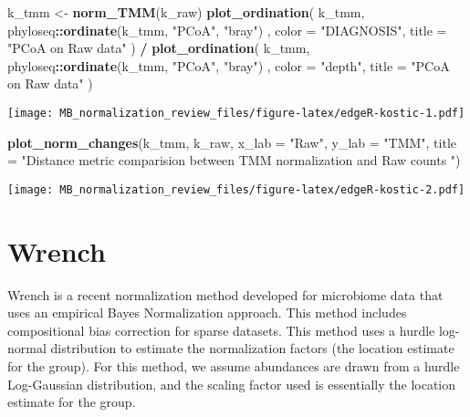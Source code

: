 \documentclass[
]{book}
\newenvironment{Shaded}{\begin{snugshade}}{\end{snugshade}}
\newcommand{\DataTypeTok}[1]{\textcolor[rgb]{0.13,0.29,0.53}{#1}}
\newcommand{\KeywordTok}[1]{\textcolor[rgb]{0.13,0.29,0.53}{\textbf{#1}}}
\newcommand{\NormalTok}[1]{#1}
\newcommand{\OperatorTok}[1]{\textcolor[rgb]{0.81,0.36,0.00}{\textbf{#1}}}
\newcommand{\StringTok}[1]{\textcolor[rgb]{0.31,0.60,0.02}{#1}}
\begin{document}
\begin{Shaded}
\begin{Highlighting}[]
\NormalTok{k\_tmm \textless{}{-}}\StringTok{ }\KeywordTok{norm\_TMM}\NormalTok{(k\_raw)}
\KeywordTok{plot\_ordination}\NormalTok{(}
\NormalTok{    k\_tmm,}
\NormalTok{    phyloseq}\OperatorTok{::}\KeywordTok{ordinate}\NormalTok{(k\_tmm, }\StringTok{"PCoA"}\NormalTok{, }\StringTok{"bray"}\NormalTok{) ,}
    \DataTypeTok{color =} \StringTok{"DIAGNOSIS"}\NormalTok{,}
    \DataTypeTok{title =} \StringTok{"PCoA on Raw data"}
\NormalTok{) }\OperatorTok{/}
\StringTok{    }\KeywordTok{plot\_ordination}\NormalTok{(}
\NormalTok{        k\_tmm,}
\NormalTok{        phyloseq}\OperatorTok{::}\KeywordTok{ordinate}\NormalTok{(k\_tmm, }\StringTok{"PCoA"}\NormalTok{, }\StringTok{"bray"}\NormalTok{) ,}
        \DataTypeTok{color =} \StringTok{"depth"}\NormalTok{,}
        \DataTypeTok{title =} \StringTok{"PCoA on Raw data"}
\NormalTok{    )}
\end{Highlighting}
\end{Shaded}

\texttt{[image: MB\_normalization\_review\_files/figure-latex/edgeR-kostic-1.pdf]}

\begin{Shaded}
\begin{Highlighting}[]
\KeywordTok{plot\_norm\_changes}\NormalTok{(k\_tmm, k\_raw,}
                  \DataTypeTok{x\_lab =} \StringTok{"Raw"}\NormalTok{, }\DataTypeTok{y\_lab =} \StringTok{"TMM"}\NormalTok{,}
                  \DataTypeTok{title =} \StringTok{"Distance metric comparision between TMM normalization and Raw counts "}\NormalTok{)}
\end{Highlighting}
\end{Shaded}

\texttt{[image: MB\_normalization\_review\_files/figure-latex/edgeR-kostic-2.pdf]}

\hypertarget{wrench}{%
\chapter{Wrench}\label{wrench}}

Wrench is a recent normalization method developed for microbiome data \citep{kumar2018} that uses an empirical Bayes Normalization approach. This method includes compositional bias correction for sparse datasets. This method uses a hurdle log-normal distribution to estimate the normalization factors (the location estimate for the group). For this method, we assume abundances are drawn from a hurdle Log-Gaussian distribution, and the scaling factor used is essentially the location estimate for the group.
\end{document}
